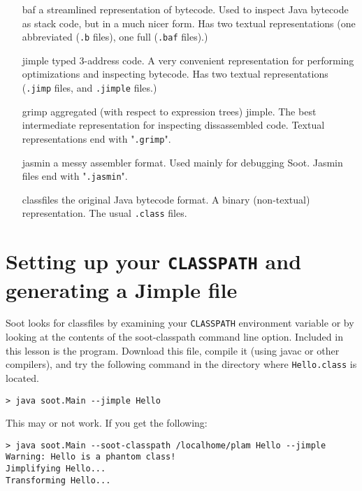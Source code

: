 \documentclass{article}
\begin{document}
\begin{enumerate}
\item[baf] a streamlined representation of bytecode.  Used to inspect Java
bytecode as stack code, but in a much nicer form.  Has two textual
representations (one abbreviated ({\tt .b} files), one full ({\tt .baf} 
files).)

\item[jimple] typed 3-address code.  A very convenient representation
for performing optimizations and inspecting bytecode.  Has two textual
representations ({\tt .jimp} files, and {\tt .jimple} files.)

\item[grimp] aggregated (with respect to expression trees) jimple.  The best
intermediate representation for inspecting dissassembled code.  Textual
representations end with "{\tt .grimp}".

\item[jasmin] a messy assembler format.  Used mainly for debugging 
Soot.  Jasmin files end with "{\tt .jasmin}".

\item[classfiles] the original Java bytecode format.  A binary (non-textual)
representation.  The usual {\tt .class} files.
\end{enumerate}

\section{Setting up your {\tt CLASSPATH} and generating a Jimple file}

Soot looks for classfiles by examining your {\tt CLASSPATH} environment
variable or by looking at the contents of the soot-classpath command
line option.  Included in this lesson is the {} program.
Download this file, compile it (using javac or other compilers), and try the following
command in the directory where {\tt Hello.class} is located.

\begin{verbatim}
> java soot.Main --jimple Hello
\end{verbatim}

This may or not work.  If you get the following:

\begin{verbatim}
> java soot.Main --soot-classpath /localhome/plam Hello --jimple
Warning: Hello is a phantom class!
Jimplifying Hello...
Transforming Hello...
\end{verbatim}
\end{document}
